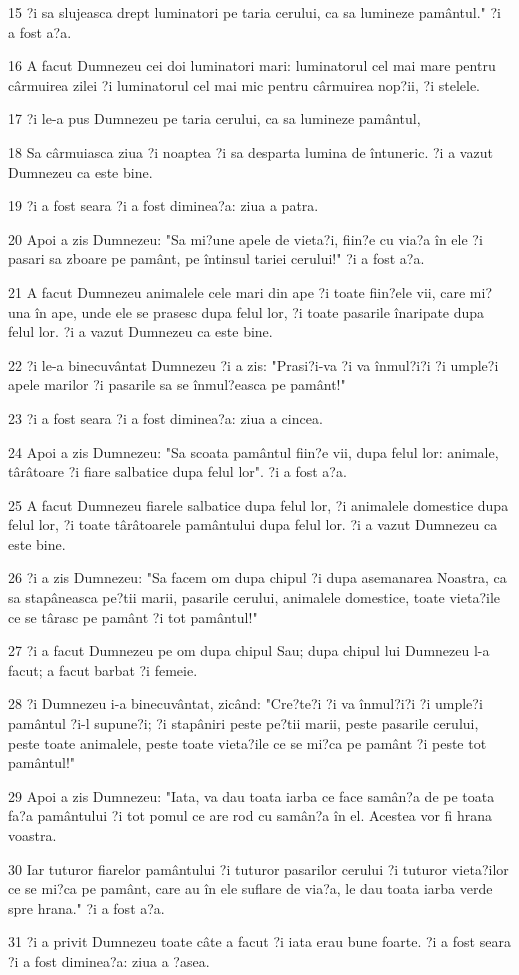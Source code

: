 \par 15 ?i sa slujeasca drept luminatori pe taria cerului, ca sa lumineze pamântul." ?i a fost a?a.
\par 16 A facut Dumnezeu cei doi luminatori mari: luminatorul cel mai mare pentru cârmuirea zilei ?i luminatorul cel mai mic pentru cârmuirea nop?ii, ?i stelele.
\par 17 ?i le-a pus Dumnezeu pe taria cerului, ca sa lumineze pamântul,
\par 18 Sa cârmuiasca ziua ?i noaptea ?i sa desparta lumina de întuneric. ?i a vazut Dumnezeu ca este bine.
\par 19 ?i a fost seara ?i a fost diminea?a: ziua a patra.
\par 20 Apoi a zis Dumnezeu: "Sa mi?une apele de vieta?i, fiin?e cu via?a în ele ?i pasari sa zboare pe pamânt, pe întinsul tariei cerului!" ?i a fost a?a.
\par 21 A facut Dumnezeu animalele cele mari din ape ?i toate fiin?ele vii, care mi?una în ape, unde ele se prasesc dupa felul lor, ?i toate pasarile înaripate dupa felul lor. ?i a vazut Dumnezeu ca este bine.
\par 22 ?i le-a binecuvântat Dumnezeu ?i a zis: "Prasi?i-va ?i va înmul?i?i ?i umple?i apele marilor ?i pasarile sa se înmul?easca pe pamânt!"
\par 23 ?i a fost seara ?i a fost diminea?a: ziua a cincea.
\par 24 Apoi a zis Dumnezeu: "Sa scoata pamântul fiin?e vii, dupa felul lor: animale, târâtoare ?i fiare salbatice dupa felul lor". ?i a fost a?a.
\par 25 A facut Dumnezeu fiarele salbatice dupa felul lor, ?i animalele domestice dupa felul lor, ?i toate târâtoarele pamântului dupa felul lor. ?i a vazut Dumnezeu ca este bine.
\par 26 ?i a zis Dumnezeu: "Sa facem om dupa chipul ?i dupa asemanarea Noastra, ca sa stapâneasca pe?tii marii, pasarile cerului, animalele domestice, toate vieta?ile ce se târasc pe pamânt ?i tot pamântul!"
\par 27 ?i a facut Dumnezeu pe om dupa chipul Sau; dupa chipul lui Dumnezeu l-a facut; a facut barbat ?i femeie.
\par 28 ?i Dumnezeu i-a binecuvântat, zicând: "Cre?te?i ?i va înmul?i?i ?i umple?i pamântul ?i-l supune?i; ?i stapâniri peste pe?tii marii, peste pasarile cerului, peste toate animalele, peste toate vieta?ile ce se mi?ca pe pamânt ?i peste tot pamântul!"
\par 29 Apoi a zis Dumnezeu: "Iata, va dau toata iarba ce face samân?a de pe toata fa?a pamântului ?i tot pomul ce are rod cu samân?a în el. Acestea vor fi hrana voastra.
\par 30 Iar tuturor fiarelor pamântului ?i tuturor pasarilor cerului ?i tuturor vieta?ilor ce se mi?ca pe pamânt, care au în ele suflare de via?a, le dau toata iarba verde spre hrana." ?i a fost a?a.
\par 31 ?i a privit Dumnezeu toate câte a facut ?i iata erau bune foarte. ?i a fost seara ?i a fost diminea?a: ziua a ?asea.

